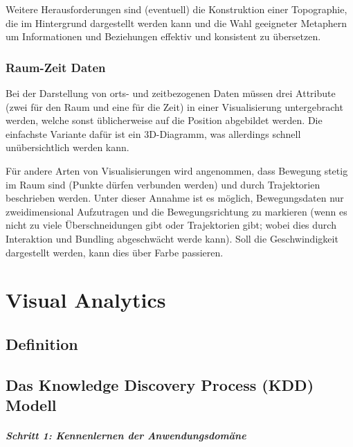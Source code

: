 			Weitere Herausforderungen sind (eventuell) die Konstruktion einer Topographie, die im Hintergrund dargestellt werden kann und die Wahl geeigneter Metaphern um Informationen und Beziehungen effektiv und konsistent zu übersetzen.

		\subsection{Raum-Zeit Daten}
			Bei der Darstellung von orts- und zeitbezogenen Daten müssen drei Attribute (zwei für den Raum und eine für die Zeit) in einer Visualisierung untergebracht werden, welche sonst üblicherweise auf die Position abgebildet werden. Die einfachste Variante dafür ist ein 3D-Diagramm, was allerdings schnell unübersichtlich werden kann.

			Für andere Arten von Visualisierungen wird angenommen, dass Bewegung stetig im Raum sind (\dh Punkte dürfen verbunden werden) und durch Trajektorien beschrieben werden. Unter dieser Annahme ist es möglich, Bewegungsdaten nur zweidimensional Aufzutragen und die Bewegungsrichtung zu markieren (wenn es nicht zu viele Überschneidungen gibt oder Trajektorien gibt; wobei dies durch Interaktion und Bundling abgeschwächt werde kann). Soll die Geschwindigkeit dargestellt werden, kann dies \bspw über Farbe passieren.

\chapter{Visual Analytics} %

    \section{Definition} %

    \section{Das Knowledge Discovery Process (KDD) Modell} %

        \paragraph{Schritt 1: Kennenlernen der Anwendungsdomäne} %

